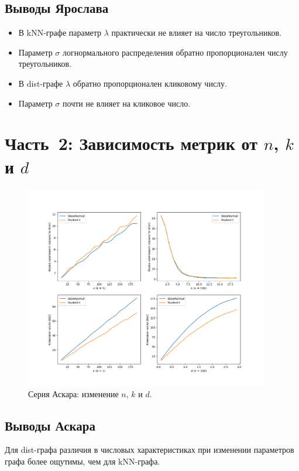 \documentclass[a4paper,12pt]{article}
\begin{document}
\subsection*{Выводы Ярослава }
\begin{itemize}
    \item В kNN-графе параметр $\lambda$ практически не влияет на число треугольников.
    \item Параметр $\sigma$ логнормального распределения обратно пропорционален числу треугольников.
    \item В dist-графе $\lambda$ обратно пропорционален кликовому числу.
    \item Параметр $\sigma$ почти не влияет на кликовое число.
\end{itemize}

\section*{Часть 2: Зависимость метрик от $n$, $k$ и $d$}

\begin{figure}[H]
    \centering
    \includegraphics[width=0.95\textwidth]{part2_results_Askar.png}
    \caption{Серия Аскара: изменение $n$, $k$ и $d$.}
    \label{fig:part2-askar}
\end{figure}

\subsection*{Выводы Аскара }
Для dist-графа различия в числовых характеристиках при изменении параметров графа более ощутимы, чем для kNN-графа.
\end{document}

